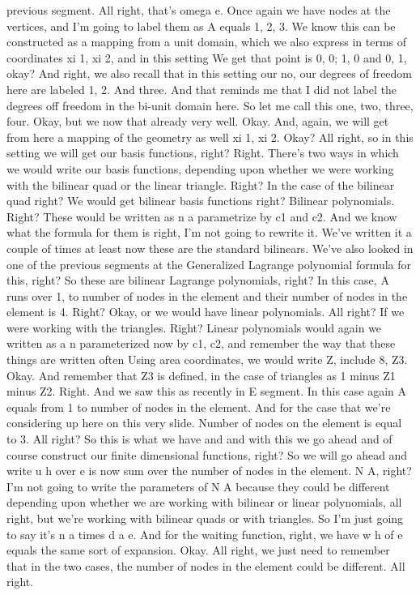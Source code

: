 \documentclass[10pt]{article}
\begin{document}
previous segment. All right, that's omega e. Once again we have nodes at the vertices, and I'm going to label them as A equals 1, 2, 3. We know this can be constructed as a mapping from a unit domain, which we also express in terms of coordinates xi 1, xi 2, and in this setting We get that point is 0, 0; 1, 0 and 0, 1, okay? And right, we also recall that in this setting our no, our degrees of freedom here are labeled 1, 2. And three. And that reminds me that I did not label the degrees off freedom in the bi-unit domain here. So let me call this one, two, three, four. Okay, but we now that already very well. Okay. And, again, we will get from here a mapping of the geometry as well xi 1, xi 2. Okay? All right, so in this setting we will get our basis functions, right? Right. There's two ways in which we would write our basis functions, depending upon whether we were working with the bilinear quad or the linear triangle. Right? In the case of the bilinear quad right? We would get bilinear basis functions right? Bilinear polynomials. Right? These would be written as n a parametrize by c1 and c2. And we know what the formula for them is right, I'm not going to rewrite it. We've written it a couple of times at least now these are the standard bilinears. We've also looked in one of the previous segments at the Generalized Lagrange polynomial formula for this, right? So these are bilinear Lagrange polynomials, right? In this case, A runs over 1, to number of nodes in the element and their number of nodes in the element is 4. Right? Okay, or we would have linear polynomials. All right? If we were working with the triangles. Right? Linear polynomials would again we written as a n parameterized now by c1, c2, and remember the way that these things are written often Using area coordinates, we would write Z, include 8, Z3. Okay. And remember that Z3 is defined, in the case of triangles as 1 minus Z1 minus Z2. Right. And we saw this as recently in E segment. In this case again A equals from 1 to number of nodes in the element. And for the case that we're considering up here on this very slide. Number of nodes on the element is equal to 3. All right? So this is what we have and and with this we go ahead and of course construct our finite dimensional functions, right? So we will go ahead and write u h over e is now sum over the number of nodes in the element. N A, right? I'm not going to write the parameters of N A because they could be different depending upon whether we are working with bilinear or linear polynomials, all right, but we're working with bilinear quads or with triangles. So I'm just going to say it's n a times d a e. And for the waiting function, right, we have w h of e equals the same sort of expansion. Okay. All right, we just need to remember that in the two cases, the number of nodes in the element could be different. All right.
\end{document}
